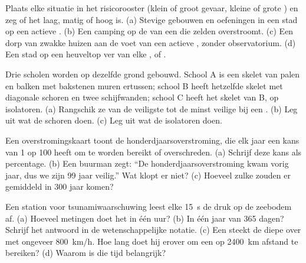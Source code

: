 \begin{exercise}[$\star\star$]\label{exo:g9:natural-risks:7}
Plaats elke situatie in het risicorooster (klein of groot gevaar, kleine
of grote ) en zeg of het  laag, matig of hoog is.
(a) Stevige gebouwen en oefeningen in een stad op een actieve .
(b) Een camping op de  van een  die zelden
overstroomt. (c) Een dorp van zwakke huizen aan de voet van een actieve
, zonder observatorium. (d) Een stad op een heuveltop ver van elke
,  of .
\end{exercise}

\begin{exercise}[$\star\star$]\label{exo:g9:natural-risks:8}
Drie scholen worden op dezelfde grond gebouwd. School A is een skelet van
palen en balken met bakstenen muren ertussen; school B heeft hetzelfde
skelet met diagonale schoren en twee schijfwanden; school C heeft het
skelet van B, op isolatoren. (a) Rangschik ze van de veiligste tot de
minst veilige bij een . (b) Leg uit wat de schoren doen.
(c) Leg uit wat de isolatoren doen.
\end{exercise}

\begin{exercise}[$\star\star$]\label{exo:g9:natural-risks:9}
Een overstromingskaart toont de honderdjaarsoverstroming, die elk jaar
een kans van 1 op 100 heeft om te worden bereikt of overschreden.
(a) Schrijf deze kans als percentage. (b) Een buurman zegt: ``De
honderdjaarsoverstroming kwam vorig jaar, dus we zijn 99 jaar veilig.''
Wat klopt er niet? (c) Hoeveel zulke  zouden er gemiddeld
in 300 jaar komen?
\end{exercise}

\begin{exercise}[$\star\star$]\label{exo:g9:natural-risks:10}
Een station voor tsunamiwaarschuwing leest elke \qty{15}{s} de druk op de
zeebodem af. (a) Hoeveel metingen doet het in één uur? (b) In één jaar van
365 dagen? Schrijf het antwoord in de wetenschappelijke notatie. (c) Een
 steekt de diepe  over met ongeveer \qty{800}{km/h}. Hoe lang
doet hij erover om een  op \qty{2400}{km} afstand te bereiken?
(d) Waarom is die tijd belangrijk?
\end{exercise}

